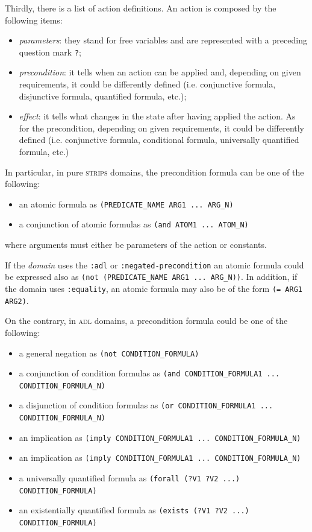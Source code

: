 Thirdly, there is a list of action definitions. An action is composed by the following items:
\begin{itemize}
\item \textit{parameters}: they stand for free variables and are represented with a preceding question mark \texttt{?};
\item \textit{precondition}: it tells when an action can be applied and, depending on given requirements, it could be differently defined (i.e. conjunctive formula, disjunctive formula, quantified formula, etc.);
\item \textit{effect}: it tells what changes in the state after having applied the action. As for the precondition, depending on given requirements, it could be differently defined (i.e. conjunctive formula, conditional formula, universally quantified formula, etc.)
\end{itemize}

In particular, in pure \textsc{strips} domains, the precondition formula can be one of the following:
\begin{itemize}
\item an atomic formula as \texttt{(PREDICATE\_NAME ARG1 ... ARG\_N)}
\item a conjunction of atomic formulas as \texttt{(and ATOM1 ... ATOM\_N)}
\end{itemize}
where arguments must either be parameters of the action or constants.

If the \textit{domain} uses the \texttt{:adl} or \texttt{:negated-precondition} an atomic formula could be expressed also as  \texttt{(not (PREDICATE\_NAME ARG1 ... ARG\_N))}. In addition, if the domain uses \texttt{:equality}, an atomic formula may also be of the form \texttt{(= ARG1 ARG2)}.

On the contrary, in \textsc{adl} domains, a precondition formula could be one of the following:
\begin{itemize}
\item a general negation as \texttt{(not CONDITION\_FORMULA)}
\item a conjunction of condition formulas as \texttt{(and CONDITION\_FORMULA1 ... \\CONDITION\_FORMULA\_N)}
\item a disjunction of condition formulas as \texttt{(or CONDITION\_FORMULA1 ... \\CONDITION\_FORMULA\_N)}
\item an implication as \texttt{(imply CONDITION\_FORMULA1 ... CONDITION\_FORMULA\_N)}
\item an implication as \texttt{(imply CONDITION\_FORMULA1 ... CONDITION\_FORMULA\_N)}
\item a universally quantified formula as \texttt{(forall (?V1 ?V2 ...) CONDITION\_FORMULA)}
\item an existentially quantified formula as \texttt{(exists (?V1 ?V2 ...)\\ CONDITION\_FORMULA)}
\end{itemize}

